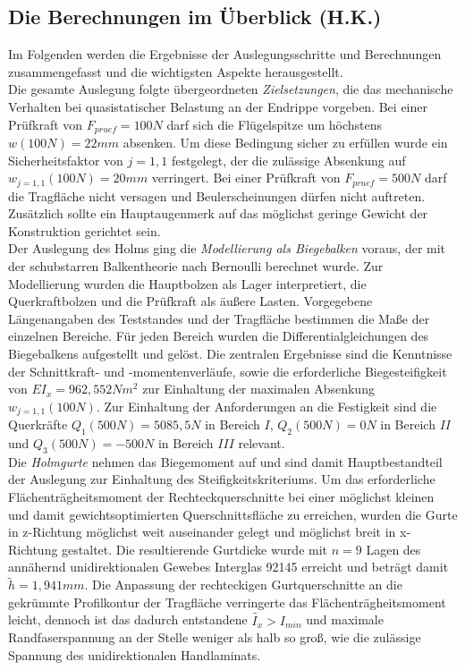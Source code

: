 \subsection{Die Berechnungen im Überblick (H.K.)}
Im Folgenden werden die Ergebnisse der Auslegungsschritte und Berechnungen zusammengefasst und die wichtigsten Aspekte herausgestellt.\\

\noindent Die gesamte Auslegung folgte übergeordneten \textit{Zielsetzungen}, die das mechanische Verhalten bei quasistatischer Belastung an der Endrippe vorgeben. Bei einer Prüfkraft von $ F_{pruef}=100N $ darf sich die Flügelspitze um höchstens $ w(100N)=22mm $ absenken. Um diese Bedingung sicher zu erfüllen wurde ein Sicherheitsfaktor von $ j=1,1 $ festgelegt, der die zulässige Absenkung auf $ w_{j=1,1}(100N)=20mm $ verringert. Bei einer Prüfkraft von $ F_{pruef}=500N $ darf die Tragfläche nicht versagen und Beulerscheinungen dürfen nicht auftreten. Zusätzlich sollte ein Hauptaugenmerk auf das möglichst geringe Gewicht der Konstruktion gerichtet sein.\\

\noindent Der Auslegung des Holms ging die \textit{Modellierung als Biegebalken} voraus, der mit der schubstarren Balkentheorie nach Bernoulli berechnet wurde. Zur Modellierung wurden die Hauptbolzen als Lager interpretiert, die Querkraftbolzen und die Prüfkraft als äußere Lasten. Vorgegebene Längenangaben des Teststandes und der Tragfläche bestimmen die Maße der einzelnen Bereiche. Für jeden Bereich wurden die Differentialgleichungen des Biegebalkens aufgestellt und gelöst. Die zentralen Ergebnisse sind die Kenntnisse der Schnittkraft- und -momentenverläufe, sowie die erforderliche Biegesteifigkeit von $ EI_{x}=962,552Nm^{2} $ zur Einhaltung der maximalen Absenkung $ w_{j=1,1}(100N) $. Zur Einhaltung der Anforderungen an die Festigkeit sind die Querkräfte $ Q_{1}(500N)=5085,5N $ in Bereich $ I $, $ Q_{2}(500N)=0N $ in Bereich $ II $ und $ Q_{3}(500N)=-500N $ in Bereich $ III $ relevant.\\

\noindent Die \textit{Holmgurte} nehmen das Biegemoment auf und sind damit Hauptbestandteil der Auslegung zur Einhaltung des Steifigkeitskriteriums. Um das erforderliche Flächenträgheitsmoment der Rechteckquerschnitte bei einer möglichst kleinen und damit gewichtsoptimierten Querschnittsfläche zu erreichen, wurden die Gurte in z-Richtung möglichst weit auseinander gelegt und möglichst breit in x-Richtung gestaltet. Die resultierende Gurtdicke wurde mit $ n=9 $ Lagen des annähernd unidirektionalen Gewebes Interglas 92145 erreicht und beträgt damit $ \tilde{h}=1,941mm $. Die Anpassung der rechteckigen Gurtquerschnitte an die gekrümmte Profilkontur der Tragfläche verringerte das Flächenträgheitsmoment leicht, dennoch ist das dadurch entstandene $ \tilde{I_{x}}>I_{min} $ und maximale Randfaserspannung an der Stelle weniger als halb so groß, wie die zulässige Spannung des unidirektionalen Handlaminats.\\


